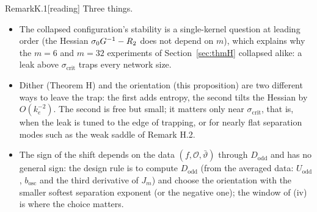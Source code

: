 \begin{rmk}{Remark}{K.1}[reading]
Three things.
\begin{itemize}
  \item The collapsed configuration's stability is a single-kernel question at leading order (the Hessian
    $\sigma_0G^{-1} - R_2$ does not depend on $m$), which explains why the $m = 6$ and $m = 32$ experiments of
    Section~\ref{sec:thmH} collapsed alike: a leak above $\sigma_{\mathrm{crit}}$ traps every network size.
  \item Dither (Theorem H) and the orientation (this proposition) are two different ways to leave the trap: the first
    adds entropy, the second tilts the Hessian by $O(k_e^{-2})$. The second is free but small; it matters only near
    $\sigma_{\mathrm{crit}}$, that is, when the leak is tuned to the edge of trapping, or for nearly flat separation
    modes such as the weak saddle of Remark H.2.
  \item The sign of the shift depends on the data $(f,\mathcal O,\bar\vartheta)$ through $D_{\mathrm{odd}}$ and has
    no general sign: the design rule is to compute $D_{\mathrm{odd}}$ (from the averaged data: $U_{\mathrm{odd}}$,
    $b_{\mathrm{osc}}$ and the third derivative of $J_m$) and choose the orientation with the smaller softest
    separation exponent (or the negative one); the window of (iv) is where the choice matters.
\end{itemize}
\end{rmk}

